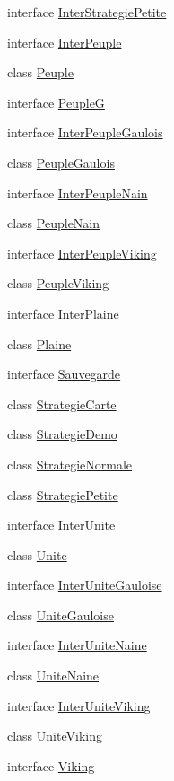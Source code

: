 \begin{DoxyCompactItemize}
\item 
interface \hyperlink{interface_small_world_1_1_inter_strategie_petite}{Inter\-Strategie\-Petite}
\item 
interface \hyperlink{interface_small_world_1_1_inter_peuple}{Inter\-Peuple}
\item 
class \hyperlink{class_small_world_1_1_peuple}{Peuple}
\item 
interface \hyperlink{interface_small_world_1_1_peuple_g}{Peuple\-G}
\item 
interface \hyperlink{interface_small_world_1_1_inter_peuple_gaulois}{Inter\-Peuple\-Gaulois}
\item 
class \hyperlink{class_small_world_1_1_peuple_gaulois}{Peuple\-Gaulois}
\item 
interface \hyperlink{interface_small_world_1_1_inter_peuple_nain}{Inter\-Peuple\-Nain}
\item 
class \hyperlink{class_small_world_1_1_peuple_nain}{Peuple\-Nain}
\item 
interface \hyperlink{interface_small_world_1_1_inter_peuple_viking}{Inter\-Peuple\-Viking}
\item 
class \hyperlink{class_small_world_1_1_peuple_viking}{Peuple\-Viking}
\item 
interface \hyperlink{interface_small_world_1_1_inter_plaine}{Inter\-Plaine}
\item 
class \hyperlink{class_small_world_1_1_plaine}{Plaine}
\item 
interface \hyperlink{interface_small_world_1_1_sauvegarde}{Sauvegarde}
\item 
class \hyperlink{class_small_world_1_1_strategie_carte}{Strategie\-Carte}
\item 
class \hyperlink{class_small_world_1_1_strategie_demo}{Strategie\-Demo}
\item 
class \hyperlink{class_small_world_1_1_strategie_normale}{Strategie\-Normale}
\item 
class \hyperlink{class_small_world_1_1_strategie_petite}{Strategie\-Petite}
\item 
interface \hyperlink{interface_small_world_1_1_inter_unite}{Inter\-Unite}
\item 
class \hyperlink{class_small_world_1_1_unite}{Unite}
\item 
interface \hyperlink{interface_small_world_1_1_inter_unite_gauloise}{Inter\-Unite\-Gauloise}
\item 
class \hyperlink{class_small_world_1_1_unite_gauloise}{Unite\-Gauloise}
\item 
interface \hyperlink{interface_small_world_1_1_inter_unite_naine}{Inter\-Unite\-Naine}
\item 
class \hyperlink{class_small_world_1_1_unite_naine}{Unite\-Naine}
\item 
interface \hyperlink{interface_small_world_1_1_inter_unite_viking}{Inter\-Unite\-Viking}
\item 
class \hyperlink{class_small_world_1_1_unite_viking}{Unite\-Viking}
\item 
interface \hyperlink{interface_small_world_1_1_viking}{Viking}
\end{DoxyCompactItemize}
